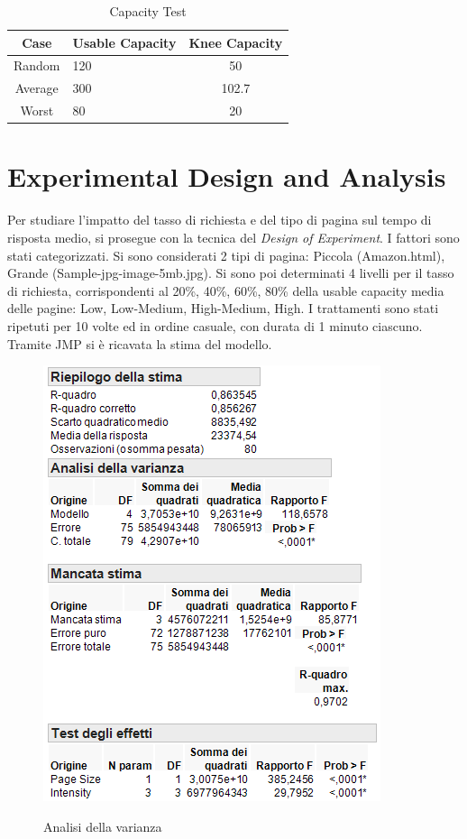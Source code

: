 		\begin{table}
			\footnotesize
			\caption{Capacity Test}
			\label{tab:ct}
			\centering
			\begin{tabular}{cp{}c}
				\toprule
				\textbf{Case} &
				\textbf{Usable Capacity} &
				\textbf{Knee Capacity}\\
				\midrule
				Random &
				120 &
				50\\
				\midrule
				Average &
				300 &
				102.7\\
				\midrule
				Worst &
				80 &
				20\\
				\bottomrule			
			\end{tabular}
		\end{table}
	
	\section{Experimental Design and Analysis}
		Per studiare l'impatto del tasso di richiesta e del tipo di pagina sul tempo di risposta medio, si prosegue con la tecnica del \emph{Design of Experiment}. I fattori sono stati categorizzati. Si sono considerati 2 tipi di pagina: Piccola (Amazon.html), Grande (Sample-jpg-image-5mb.jpg). Si sono poi determinati 4 livelli per il tasso di richiesta, corrispondenti al 20\%, 40\%, 60\%, 80\% della usable capacity media delle pagine: Low, Low-Medium, High-Medium, High. I trattamenti sono stati ripetuti per 10 volte ed in ordine casuale, con durata di 1 minuto ciascuno. Tramite JMP si è ricavata la stima del modello.
		
		\begin{figure}[H]
			\centering
			\includegraphics{./immagine/Stimamodello1.png}
			\label{fig:doe-st}
			\caption{Analisi della varianza}
		\end{figure}
	
